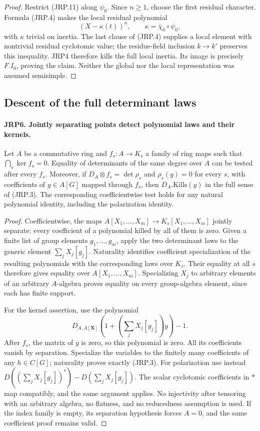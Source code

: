 \documentclass[11pt,a4paper]{article}
\numberwithin{equation}{section}
\theoremstyle{remark}\newtheorem{remark}[theorem]{Remark}
\begin{document}
\begin{proof}
Restrict (JRP.11) along \(\psi_0\).  Since \(n\ge1\), choose
the first residual character.  Formula (JRP.4) makes the local
residual polynomial
\[
                  (X-\kappa(t))^n,
       \qquad\kappa=\bar\chi_0\circ\psi_0,
\]
with \(\kappa\) trivial on inertia.  The last clause of (JRP.4)
supplies a local element with nontrivial residual cyclotomic value;
the residue-field inclusion \(k\to k'\) preserves this
inequality.  JRP4 therefore kills the full local inertia.
Its image is precisely \(F.I_0\), proving the claim.  Neither
the global nor the local representation was assumed semisimple.
\end{proof}

\subsection{Descent of the full determinant laws}

\paragraph{JRP6. Jointly separating points detect polynomial laws and their kernels.}
\label{claim:JRP6}
Let \(A\) be a commutative ring and
\(f_s:A\to K_s\) a family of ring maps such that
\(\bigcap_s\ker f_s=0\).  Equality of determinants of the same
degree over \(A\) can be tested after every \(f_s\).
Moreover, if \(D_A\otimes f_s=\det\rho_s\) and
\(\rho_s(y)=0\) for every \(s\), with coefficients of
\(y\in A[G]\) mapped through \(f_s\), then
\(D_A.\mathrm{Kills}(y)\) in the full sense of (JRP.3).
The corresponding coefficientwise test holds for any natural
polynomial identity, including the polarization identity.
\begin{proof}
Coefficientwise, the maps
\(A[X_1,\ldots,X_m]\to K_s[X_1,\ldots,X_m]\) jointly
separate: every coefficient of a polynomial killed by all of them
is zero.  Given a finite list of group elements \(g_1,\ldots,g_m\),
apply the two determinant laws to the generic element
\(\sum_jX_j[g_j]\).  Naturality identifies coefficient
specialization of the resulting polynomials with the corresponding
laws over \(K_s\).  Their equality at all \(s\) therefore gives
equality over \(A[X_1,\ldots,X_m]\).  Specializing \(X_j\) to
arbitrary elements of an arbitrary \(A\)-algebra proves equality
on every group-algebra element, since each has finite support.

For the kernel assertion, use the polynomial
\[
 D_{A,A[\mathbf X]}
       \left(1+\left(\sum_jX_j[g_j]\right)y\right)-1.
 \tag{JRP.12}
\]
After \(f_s\), the matrix of \(y\) is zero, so this polynomial
is zero.  All its coefficients vanish by separation.  Specialize
the variables to the finitely many coefficients of any
\(h\in C[G]\); naturality proves exactly (JRP.3).
For polarization use instead
\(D((\sum_jX_j[g_j])^*)-D(\sum_jX_j[g_j])\).
The scalar cyclotomic coefficients in \(*\) map compatibly, and
the same argument applies.  No injectivity after tensoring with an
arbitrary algebra, no flatness, and no reducedness assumption is
used.  If the index family is empty, its separation hypothesis
forces \(A=0\), and the same coefficient proof remains valid.
\end{proof}
\end{document}
